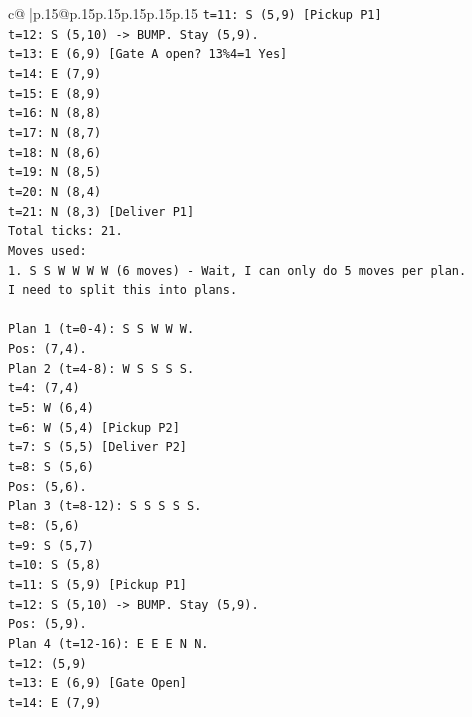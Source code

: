 \documentclass{article}
\begin{document}
{\begin{supertabular}{c@{$\;$}|p{.15\linewidth}@{}p{.15\linewidth}p{.15\linewidth}p{.15\linewidth}p{.15\linewidth}p{.15\linewidth}}
{{{\texttt{t=11: S (5,9) {[}Pickup P1{]}} \\
\texttt{t=12: S (5,10) {-}> BUMP. Stay (5,9).} \\
\texttt{t=13: E (6,9) {[}Gate A open? 13\%4=1 Yes{]}} \\
\texttt{t=14: E (7,9)} \\
\texttt{t=15: E (8,9)} \\
\texttt{t=16: N (8,8)} \\
\texttt{t=17: N (8,7)} \\
\texttt{t=18: N (8,6)} \\
\texttt{t=19: N (8,5)} \\
\texttt{t=20: N (8,4)} \\
\texttt{t=21: N (8,3) {[}Deliver P1{]}} \\
\texttt{Total ticks: 21.} \\
\texttt{Moves used:} \\
\texttt{1. S S W W W W (6 moves) {-} Wait, I can only do 5 moves per plan.} \\
\texttt{I need to split this into plans.} \\
\\ 
\texttt{Plan 1 (t=0{-}4): S S W W W.} \\
\texttt{Pos: (7,4).} \\
\texttt{Plan 2 (t=4{-}8): W S S S S.} \\
\texttt{t=4: (7,4)} \\
\texttt{t=5: W (6,4)} \\
\texttt{t=6: W (5,4) {[}Pickup P2{]}} \\
\texttt{t=7: S (5,5) {[}Deliver P2{]}} \\
\texttt{t=8: S (5,6)} \\
\texttt{Pos: (5,6).} \\
\texttt{Plan 3 (t=8{-}12): S S S S S.} \\
\texttt{t=8: (5,6)} \\
\texttt{t=9: S (5,7)} \\
\texttt{t=10: S (5,8)} \\
\texttt{t=11: S (5,9) {[}Pickup P1{]}} \\
\texttt{t=12: S (5,10) {-}> BUMP. Stay (5,9).} \\
\texttt{Pos: (5,9).} \\
\texttt{Plan 4 (t=12{-}16): E E E N N.} \\
\texttt{t=12: (5,9)} \\
\texttt{t=13: E (6,9) {[}Gate Open{]}} \\
\texttt{t=14: E (7,9)} \\
}}}
\end{supertabular}}
\end{document}

